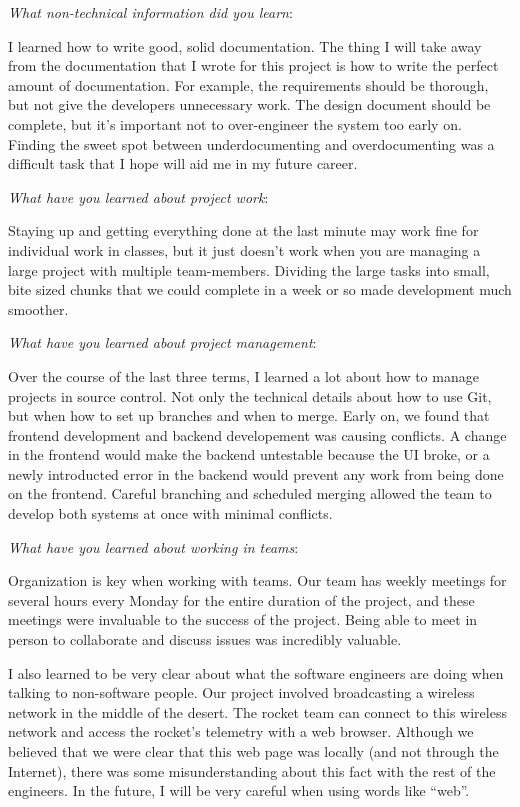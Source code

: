\documentclass[10pt,draftclsnofoot,onecolumn]{IEEEtran}
\newcommand{\subsubsubsection}[1]{
	\hfill\break\textit{#1}:
}
\begin{document}
\subsubsubsection{What non-technical information did you learn}
I learned how to write good, solid documentation.
The thing I will take away from the documentation that I wrote for this project is how to write the perfect amount of documentation.
For example, the requirements should be thorough, but not give the developers unnecessary work.
The design document should be complete, but it's important not to over-engineer the system too early on.
Finding the sweet spot between underdocumenting and overdocumenting was a difficult task that I hope will aid me in my future career.

\subsubsubsection{What have you learned about project work}
Staying up and getting everything done at the last minute may work fine for individual work in classes,
but it just doesn't work when you are managing a large project with multiple team-members.
Dividing the large tasks into small, bite sized chunks that we could complete in a week or so made development much smoother.

\subsubsubsection{What have you learned about project management}
Over the course of the last three terms, I learned a lot about how to manage projects in source control.
Not only the technical details about how to use Git, but when how to set up branches and when to merge.
Early on, we found that frontend development and backend developement was causing conflicts.
A change in the frontend would make the backend untestable because the UI broke,
or a newly introducted error in the backend would prevent any work from being done on the frontend.
Careful branching and scheduled merging allowed the team to develop both systems at once
with minimal conflicts.

\subsubsubsection{What have you learned about working in teams}
Organization is key when working with teams.
Our team has weekly meetings for several hours every Monday for the entire duration of the project, and these meetings were invaluable to the success of the project.
Being able to meet in person to collaborate and discuss issues was incredibly valuable.

I also learned to be very clear about what the software engineers are doing when talking to non-software people.
Our project involved broadcasting a wireless network in the middle of the desert.
The rocket team can connect to this wireless network and access the rocket's telemetry with a web browser.
Although we believed that we were clear that this web page was locally (and not through the Internet),
there was some misunderstanding about this fact with the rest of the engineers.
In the future, I will be very careful when using words like ``web''.
\end{document}

